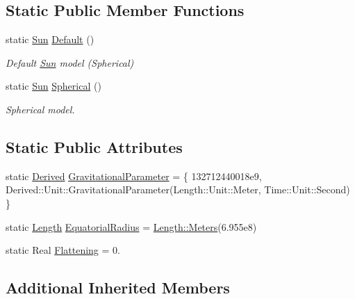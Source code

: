 \subsection*{Static Public Member Functions}
\begin{DoxyCompactItemize}
\item 
static \hyperlink{classostk_1_1physics_1_1env_1_1obj_1_1celest_1_1_sun}{Sun} \hyperlink{classostk_1_1physics_1_1env_1_1obj_1_1celest_1_1_sun_afb5fc16a88e0f2bdbbb977ffb4263dbc}{Default} ()
\begin{DoxyCompactList}\small\item\em Default \hyperlink{classostk_1_1physics_1_1env_1_1obj_1_1celest_1_1_sun}{Sun} model (Spherical) \end{DoxyCompactList}\item 
static \hyperlink{classostk_1_1physics_1_1env_1_1obj_1_1celest_1_1_sun}{Sun} \hyperlink{classostk_1_1physics_1_1env_1_1obj_1_1celest_1_1_sun_af389e90646fdc8e438caa2d31f9b54b5}{Spherical} ()
\begin{DoxyCompactList}\small\item\em Spherical model. \end{DoxyCompactList}\end{DoxyCompactItemize}
\subsection*{Static Public Attributes}
\begin{DoxyCompactItemize}
\item 
static \hyperlink{classostk_1_1physics_1_1units_1_1_derived}{Derived} \hyperlink{classostk_1_1physics_1_1env_1_1obj_1_1celest_1_1_sun_ab53baca68d9a8eaef2aa734011e29cc0}{Gravitational\+Parameter} = \{ 132712440018e9, Derived\+::\+Unit\+::\+Gravitational\+Parameter(\+Length\+::\+Unit\+::\+Meter, Time\+::\+Unit\+::\+Second) \}
\item 
static \hyperlink{classostk_1_1physics_1_1units_1_1_length}{Length} \hyperlink{classostk_1_1physics_1_1env_1_1obj_1_1celest_1_1_sun_a158d85a536619dc2f9550919a39b90a2}{Equatorial\+Radius} = \hyperlink{classostk_1_1physics_1_1units_1_1_length_ad227977ce00756791595796a0dd5ddd7}{Length\+::\+Meters}(6.\+955e8)
\item 
static Real \hyperlink{classostk_1_1physics_1_1env_1_1obj_1_1celest_1_1_sun_a04e467a3bb16cbaf9ec89cb63f556ddc}{Flattening} = 0.
\end{DoxyCompactItemize}
\subsection*{Additional Inherited Members}


